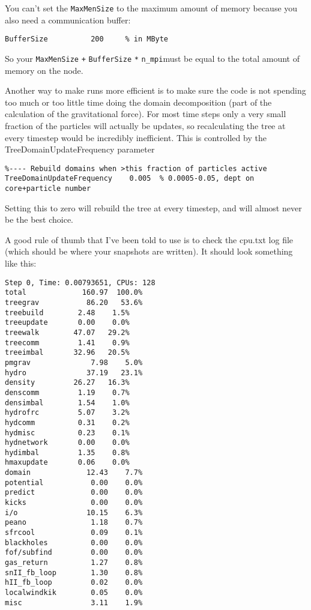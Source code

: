 \documentclass[10pt,a4paper,onecolumn]{article}
\begin{document}
You can't set the \texttt{MaxMenSize} to the maximum amount of memory because you also need a communication buffer:

\begin{verbatim}
BufferSize          200     % in MByte
\end{verbatim}

So your \texttt{MaxMenSize} \texttt{+} \texttt{BufferSize} \texttt{*} \texttt{n\_mpi}must be equal to the total amount of memory on the node.

Another way to make runs more efficient is to make sure the code is not spending too much or too little time doing the domain decomposition (part of the calculation of the gravitational force). For most time steps only a very small fraction of the particles will actually be updates, so recalculating the tree at every timestep would be incredibly inefficient. This is controlled by the TreeDomainUpdateFrequency parameter 

\begin{verbatim}
%---- Rebuild domains when >this fraction of particles active  
TreeDomainUpdateFrequency    0.005  % 0.0005-0.05, dept on core+particle number 
\end{verbatim}

Setting this to zero will rebuild the tree at every timestep, and will almost never be the best choice.

A good rule of thumb that I've been told to use is to check the cpu.txt log file (which should be where your snapshots are written). It should look something like this:

\begin{verbatim}
Step 0, Time: 0.00793651, CPUs: 128
total             160.97  100.0%
treegrav           86.20   53.6%
treebuild        2.48    1.5%
treeupdate       0.00    0.0%
treewalk        47.07   29.2%
treecomm         1.41    0.9%
treeimbal       32.96   20.5%
pmgrav              7.98    5.0%
hydro              37.19   23.1%
density         26.27   16.3%
denscomm         1.19    0.7%
densimbal        1.54    1.0%
hydrofrc         5.07    3.2%
hydcomm          0.31    0.2%
hydmisc          0.23    0.1%
hydnetwork       0.00    0.0%
hydimbal         1.35    0.8%
hmaxupdate       0.06    0.0%
domain             12.43    7.7%
potential           0.00    0.0%
predict             0.00    0.0%
kicks               0.00    0.0%
i/o                10.15    6.3%
peano               1.18    0.7%
sfrcool             0.09    0.1%
blackholes          0.00    0.0%
fof/subfind         0.00    0.0%
gas_return          1.27    0.8%
snII_fb_loop        1.30    0.8%
hII_fb_loop         0.02    0.0%
localwindkik        0.05    0.0%
misc                3.11    1.9%
\end{verbatim}
\end{document}
